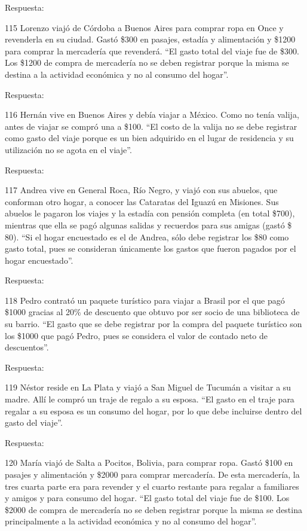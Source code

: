 \documentclass[
  openany]{book}
\begin{document}
Respuesta:

115 Lorenzo viajó de Córdoba a Buenos Aires para comprar ropa en Once y revenderla en su ciudad. Gastó \$300 en pasajes, estadía y alimentación y \$1200 para comprar la mercadería que revenderá. ``El gasto total del viaje fue de \$300. Los \$1200 de compra de mercadería no se deben registrar porque la misma se destina a la actividad económica y no al consumo del hogar''.

Respuesta:

116 Hernán vive en Buenos Aires y debía viajar a México. Como no tenía valija, antes de viajar se compró una a \$100. ``El costo de la valija no se debe registrar como gasto del viaje porque es un bien adquirido en el lugar de residencia y su utilización no se agota en el viaje''.

Respuesta:

117 Andrea vive en General Roca, Río Negro, y viajó con sus abuelos, que conforman otro hogar, a conocer las Cataratas del Iguazú en Misiones. Sus abuelos le pagaron los viajes y la estadía con pensión completa (en total \$700), mientras que ella se pagó algunas salidas y recuerdos para sus amigas (gastó \$ 80). ``Si el hogar encuestado es el de Andrea, sólo debe registrar los \$80 como gasto total, pues se consideran únicamente los gastos que fueron pagados por el hogar encuestado''.

Respuesta:

118 Pedro contrató un paquete turístico para viajar a Brasil por el que pagó \$1000 gracias al 20\% de descuento que obtuvo por ser socio de una biblioteca de su barrio. ``El gasto que se debe registrar por la compra del paquete turístico son los \$1000 que pagó Pedro, pues se considera el valor de contado neto de descuentos''.

Respuesta:

119 Néstor reside en La Plata y viajó a San Miguel de Tucumán a visitar a su madre. Allí le compró un traje de regalo a su esposa. ``El gasto en el traje para regalar a su esposa es un consumo del hogar, por lo que debe incluirse dentro del gasto del viaje''.

Respuesta:

120 María viajó de Salta a Pocitos, Bolivia, para comprar ropa. Gastó \$100 en pasajes y alimentación y \$2000 para comprar mercadería. De esta mercadería, la tres cuarta parte era para revender y el cuarto restante para regalar a familiares y amigos y para consumo del hogar. ``El gasto total del viaje fue de \$100. Los \$2000 de compra de mercadería no se deben registrar porque la misma se destina principalmente a la actividad económica y no al consumo del hogar''.
\end{document}
